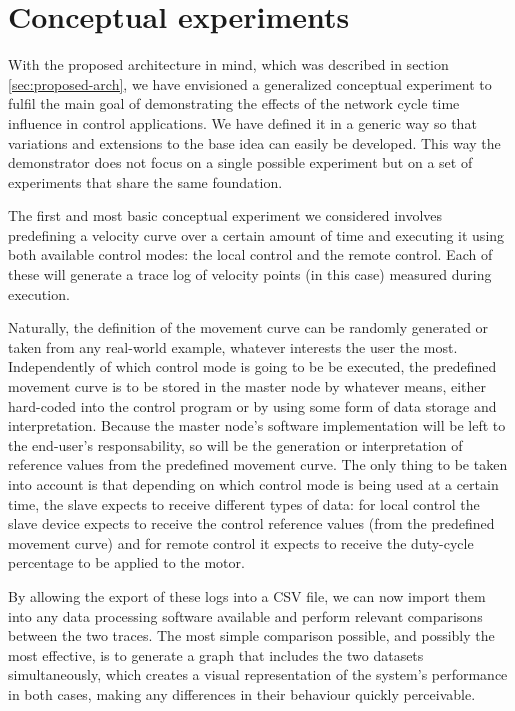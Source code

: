 \section{Conceptual experiments} \label{sec:experiments}

With the proposed architecture in mind, which was described in section \ref{sec:proposed-arch}, we have envisioned a generalized conceptual experiment to fulfil the main goal of demonstrating the effects of the network cycle time influence in control applications.
We have defined it in a generic way so that variations and extensions to the base idea can easily be developed.
This way the demonstrator does not focus on a single possible experiment but on a set of experiments that share the same foundation.

The first and most basic conceptual experiment we considered involves predefining a velocity curve over a certain amount of time and executing it using both available control modes: the local control and the remote control.
Each of these will generate a trace log of velocity points (in this case) measured during execution.

Naturally, the definition of the movement curve can be randomly generated or taken from any real-world example, whatever interests the user the most.
Independently of which control mode is going to be be executed, the predefined movement curve is to be stored in the master node by whatever means, either hard-coded into the control program or by using some form of data storage and interpretation.
Because the master node's software implementation will be left to the end-user's responsability, so will be the generation or interpretation of reference values from the predefined movement curve.
The only thing to be taken into account is that depending on which control mode is being used at a certain time, the slave expects to receive different types of data: for local control the slave device expects to receive the control reference values (from the predefined movement curve) and for remote control it expects to receive the duty-cycle percentage to be applied to the motor.

By allowing the export of these logs into a CSV file, we can now import them into any data processing software available and perform relevant comparisons between the two traces.
The most simple comparison possible, and possibly the most effective, is to generate a graph that includes the two datasets simultaneously, which creates a visual representation of the system's performance in both cases, making any differences in their behaviour quickly perceivable.



